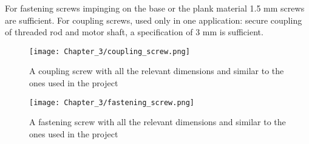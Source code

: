 For fastening screws impinging on the base or the plank material 1.5 mm screws are sufficient. For coupling screws, used only in one application: secure coupling of threaded rod and motor shaft, a specification of 3 mm is sufficient.

\begin{figure}[h]
 \centering
 \texttt{[image: Chapter\_3/coupling\_screw.png]}
 \caption{A coupling screw with all the relevant dimensions and similar to the ones used in the project}
 \label{fig:cscrew}
\end{figure} \pagebreak

\begin{figure}[h]
 \centering
 \texttt{[image: Chapter\_3/fastening\_screw.png]}
 \caption{A fastening screw with all the relevant dimensions and similar to the ones used in the project}
 \label{fig:fscrew}
\end{figure}
